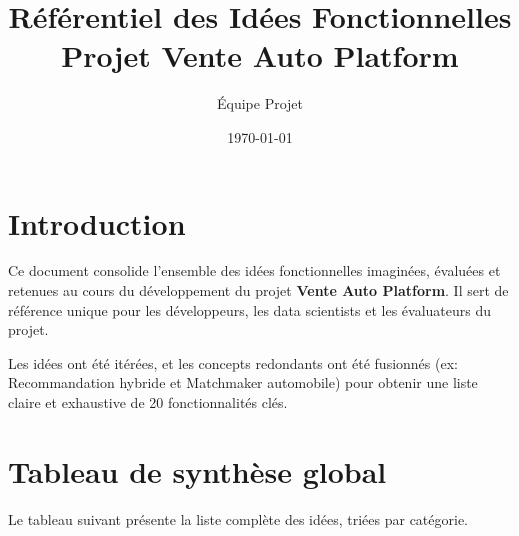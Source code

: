 \documentclass[11pt,a4paper]{article}
\title{
Référentiel des Idées Fonctionnelles\\Projet Vente Auto Platform}
\author{Équipe Projet}
\date{\today}
\begin{document}
\maketitle
\tableofcontents
\newpage

\section{Introduction}
Ce document consolide l'ensemble des idées fonctionnelles imaginées, évaluées et retenues au cours du développement du projet \textbf{Vente Auto Platform}. Il sert de référence unique pour les développeurs, les data scientists et les évaluateurs du projet.

Les idées ont été itérées, et les concepts redondants ont été fusionnés (ex: Recommandation hybride et Matchmaker automobile) pour obtenir une liste claire et exhaustive de 20 fonctionnalités clés.

\section{Tableau de synthèse global}
Le tableau suivant présente la liste complète des idées, triées par catégorie.
\end{document}
